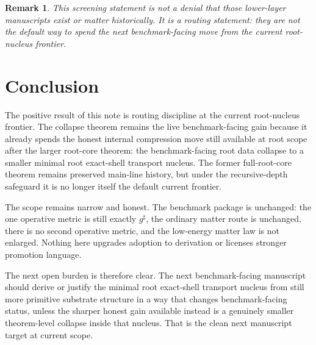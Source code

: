 \documentclass[11pt]{article}
\newcommand{\CompletedMetric}{g^{\sharp}}
\newtheorem{remark}{Remark}
\begin{document}
\begin{remark}
This screening statement is not a denial that those lower-layer manuscripts exist or matter historically. It is a routing statement: they are not the default way to spend the next benchmark-facing move from the current root-nucleus frontier.
\end{remark}

\section{Conclusion}

The positive result of this note is routing discipline at the current root-nucleus frontier. The collapse theorem remains the live benchmark-facing gain because it already spends the honest internal compression move still available at root scope after the larger root-core theorem: the benchmark-facing root data collapse to a smaller minimal root exact-shell transport nucleus. The former full-root-core theorem remains preserved main-line history, but under the recursive-depth safeguard it is no longer itself the default current frontier.

The scope remains narrow and honest. The benchmark package is unchanged: the one operative metric is still exactly \(\CompletedMetric\), the ordinary matter route is unchanged, there is no second operative metric, and the low-energy matter law is not enlarged. Nothing here upgrades adoption to derivation or licenses stronger promotion language.

The next open burden is therefore clear. The next benchmark-facing manuscript should derive or justify the minimal root exact-shell transport nucleus from still more primitive substrate structure in a way that changes benchmark-facing status, unless the sharper honest gain available instead is a genuinely smaller theorem-level collapse inside that nucleus. That is the clean next manuscript target at current scope.
\end{document}
